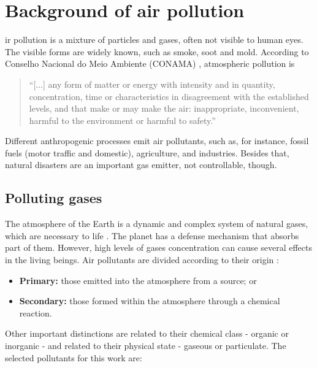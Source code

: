 \section{Background of air pollution}
\label{sec:background}

ir pollution is a mixture of particles and gases, often not visible to human
eyes. The visible forms are widely known, such as smoke, soot and mold.
According to Conselho Nacional do Meio Ambiente (CONAMA)
\cite[own translation]{conama-air-pollution}, atmospheric pollution is 

\begin{quotation}
    ``[...] any form of matter or energy with intensity and in quantity,
    concentration, time or characteristics in disagreement with the
    established levels, and that make or may make the air: inappropriate,
    inconvenient, harmful to the environment or harmful to safety.''
\end{quotation}

Different anthropogenic processes emit air pollutants, such as, for instance,
fossil fuels (motor traffic and domestic), agriculture, and industries.
Besides that, natural disasters are an important gas emitter, not controllable,
though. 

\subsection{Polluting gases}
\label{sec:polluting-gases}

The atmosphere of the Earth is a dynamic and complex system of natural gases,
which are necessary to life \cite{gases}. The planet has a defense mechanism
that absorbs part of them. However, high levels of gases concentration can cause several effects in the
living beings. Air pollutants are divided according to their origin \cite{who2006}: 

\begin{itemize}
    \item {\bf Primary:} those emitted into the atmosphere from a source; or
    \item {\bf Secondary:} those formed within the atmosphere through a
    chemical reaction.
\end{itemize}

Other important distinctions are related to their chemical class - organic or
inorganic - and related to their physical state - gaseous or particulate. The
selected pollutants for this work are: 

